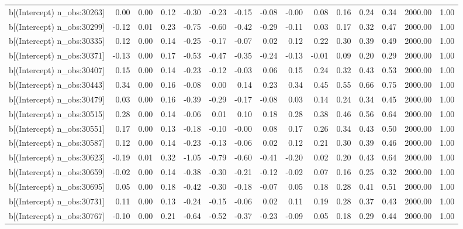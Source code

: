 \begin{table}[ht]
\begin{tabular}{rrrrrrrrrrrrrrr}
  b[(Intercept) n\_obs:30263] & 0.00 & 0.00 & 0.12 & -0.30 & -0.23 & -0.15 & -0.08 & -0.00 & 0.08 & 0.16 & 0.24 & 0.34 & 2000.00 & 1.00 \\ 
  b[(Intercept) n\_obs:30299] & -0.12 & 0.01 & 0.23 & -0.75 & -0.60 & -0.42 & -0.29 & -0.11 & 0.03 & 0.17 & 0.32 & 0.47 & 2000.00 & 1.00 \\ 
  b[(Intercept) n\_obs:30335] & 0.12 & 0.00 & 0.14 & -0.25 & -0.17 & -0.07 & 0.02 & 0.12 & 0.22 & 0.30 & 0.39 & 0.49 & 2000.00 & 1.00 \\ 
  b[(Intercept) n\_obs:30371] & -0.13 & 0.00 & 0.17 & -0.53 & -0.47 & -0.35 & -0.24 & -0.13 & -0.01 & 0.09 & 0.20 & 0.29 & 2000.00 & 1.00 \\ 
  b[(Intercept) n\_obs:30407] & 0.15 & 0.00 & 0.14 & -0.23 & -0.12 & -0.03 & 0.06 & 0.15 & 0.24 & 0.32 & 0.43 & 0.53 & 2000.00 & 1.00 \\ 
  b[(Intercept) n\_obs:30443] & 0.34 & 0.00 & 0.16 & -0.08 & 0.00 & 0.14 & 0.23 & 0.34 & 0.45 & 0.55 & 0.66 & 0.75 & 2000.00 & 1.00 \\ 
  b[(Intercept) n\_obs:30479] & 0.03 & 0.00 & 0.16 & -0.39 & -0.29 & -0.17 & -0.08 & 0.03 & 0.14 & 0.24 & 0.34 & 0.45 & 2000.00 & 1.00 \\ 
  b[(Intercept) n\_obs:30515] & 0.28 & 0.00 & 0.14 & -0.06 & 0.01 & 0.10 & 0.18 & 0.28 & 0.38 & 0.46 & 0.56 & 0.64 & 2000.00 & 1.00 \\ 
  b[(Intercept) n\_obs:30551] & 0.17 & 0.00 & 0.13 & -0.18 & -0.10 & -0.00 & 0.08 & 0.17 & 0.26 & 0.34 & 0.43 & 0.50 & 2000.00 & 1.00 \\ 
  b[(Intercept) n\_obs:30587] & 0.12 & 0.00 & 0.14 & -0.23 & -0.13 & -0.06 & 0.02 & 0.12 & 0.21 & 0.30 & 0.39 & 0.46 & 2000.00 & 1.00 \\ 
  b[(Intercept) n\_obs:30623] & -0.19 & 0.01 & 0.32 & -1.05 & -0.79 & -0.60 & -0.41 & -0.20 & 0.02 & 0.20 & 0.43 & 0.64 & 2000.00 & 1.00 \\ 
  b[(Intercept) n\_obs:30659] & -0.02 & 0.00 & 0.14 & -0.38 & -0.30 & -0.21 & -0.12 & -0.02 & 0.07 & 0.16 & 0.25 & 0.32 & 2000.00 & 1.00 \\ 
  b[(Intercept) n\_obs:30695] & 0.05 & 0.00 & 0.18 & -0.42 & -0.30 & -0.18 & -0.07 & 0.05 & 0.18 & 0.28 & 0.41 & 0.51 & 2000.00 & 1.00 \\ 
  b[(Intercept) n\_obs:30731] & 0.11 & 0.00 & 0.13 & -0.24 & -0.15 & -0.06 & 0.02 & 0.11 & 0.19 & 0.28 & 0.37 & 0.43 & 2000.00 & 1.00 \\ 
  b[(Intercept) n\_obs:30767] & -0.10 & 0.00 & 0.21 & -0.64 & -0.52 & -0.37 & -0.23 & -0.09 & 0.05 & 0.18 & 0.29 & 0.44 & 2000.00 & 1.00 \\ 

\end{tabular}
\end{table}
